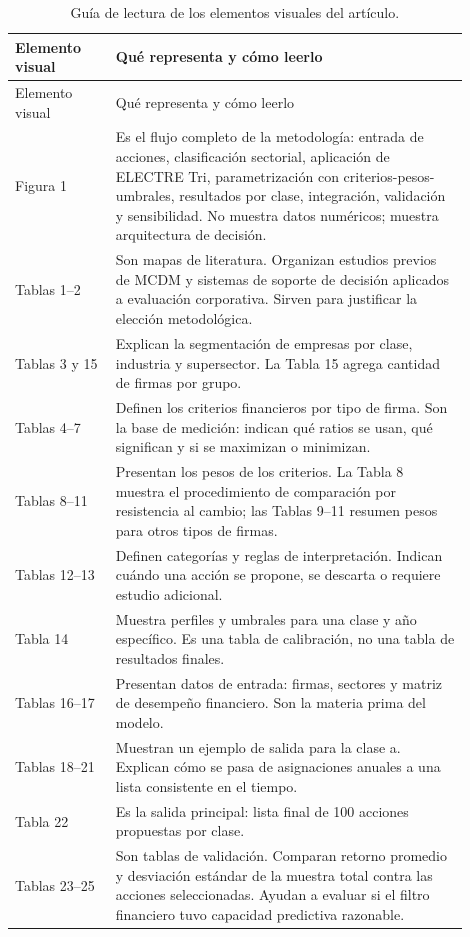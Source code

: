 \documentclass[11pt,a4paper]{article}
\begin{document}
\begin{longtable}{p{0.20\linewidth}p{0.70\linewidth}}
\caption{Guía de lectura de los elementos visuales del artículo.}\label{tab:lectura-graficas}\\
\toprule
Elemento visual & Qué representa y cómo leerlo \\
\midrule
\endfirsthead
\toprule
Elemento visual & Qué representa y cómo leerlo \\
\midrule
\endhead
Figura 1 & Es el flujo completo de la metodología: entrada de acciones, clasificación sectorial, aplicación de ELECTRE Tri, parametrización con criterios-pesos-umbrales, resultados por clase, integración, validación y sensibilidad. No muestra datos numéricos; muestra arquitectura de decisión. \\
Tablas 1--2 & Son mapas de literatura. Organizan estudios previos de MCDM y sistemas de soporte de decisión aplicados a evaluación corporativa. Sirven para justificar la elección metodológica. \\
Tablas 3 y 15 & Explican la segmentación de empresas por clase, industria y supersector. La Tabla 15 agrega cantidad de firmas por grupo. \\
Tablas 4--7 & Definen los criterios financieros por tipo de firma. Son la base de medición: indican qué ratios se usan, qué significan y si se maximizan o minimizan. \\
Tablas 8--11 & Presentan los pesos de los criterios. La Tabla 8 muestra el procedimiento de comparación por resistencia al cambio; las Tablas 9--11 resumen pesos para otros tipos de firmas. \\
Tablas 12--13 & Definen categorías y reglas de interpretación. Indican cuándo una acción se propone, se descarta o requiere estudio adicional. \\
Tabla 14 & Muestra perfiles y umbrales para una clase y año específico. Es una tabla de calibración, no una tabla de resultados finales. \\
Tablas 16--17 & Presentan datos de entrada: firmas, sectores y matriz de desempeño financiero. Son la materia prima del modelo. \\
Tablas 18--21 & Muestran un ejemplo de salida para la clase a. Explican cómo se pasa de asignaciones anuales a una lista consistente en el tiempo. \\
Tabla 22 & Es la salida principal: lista final de 100 acciones propuestas por clase. \\
Tablas 23--25 & Son tablas de validación. Comparan retorno promedio y desviación estándar de la muestra total contra las acciones seleccionadas. Ayudan a evaluar si el filtro financiero tuvo capacidad predictiva razonable. \\
\bottomrule
\end{longtable}
\end{document}

